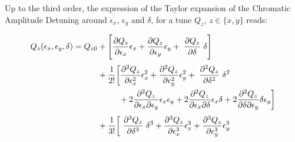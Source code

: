 Up to the third order, the expression of the Taylor expansion of the Chromatic Amplitude Detuning
around $\epsilon_x$, $\epsilon_y$ and $\delta$, for a tune $Q_z$, $z \in \{x, y\}$ reads:

\begin{equation}
\begin{aligned}
Q_z(\epsilon_x, \epsilon_y, \delta) = Q_{z0} &+ \left[\frac{\partial Q_z}{\partial \epsilon_x} \epsilon_x
                                                 + \frac{\partial Q_z}{\partial \epsilon_y} \epsilon_y
                                                 + \colorbox{yellow!0}{$\displaystyle \frac{\partial Q_z}{\partial \delta}$} \delta
                                                \right] \\
                                             &+ \frac{1}{2!} \biggl[\frac{\partial^2Q_z}{\partial \epsilon_x^2}\epsilon_x^2 
                                                 + \frac{\partial^2Q_z}{\partial \epsilon_y^2}\epsilon_y^2
                                                 + \colorbox{yellow!0}{$\displaystyle \frac{\partial^2 Q_z}{\partial \delta^2}$} \delta^2  \\
                                             &\;\begin{aligned}
                                             \phantom{+ \frac{1}{2!} \biggl[}
                                               &+ 2 \frac{\partial^2Q_z}{\partial \epsilon_x \partial \epsilon_y}\epsilon_x \epsilon_y
                                                  + 2 \frac{\partial^2Q_z}{\partial \epsilon_x \partial \delta}\epsilon_x \delta
                                                  + 2 \frac{\partial^2Q_z}{\partial \delta \partial \epsilon_y} \delta \epsilon_y
                                             \biggr] \\
                                             \end{aligned} \\
                                             &+ \frac{1}{3!}
                                             \biggl[
                                                  \colorbox{yellow!0}{$\displaystyle \frac{\partial^3 Q_z}{\partial \delta^3}$}\delta^{3}
                                                  + \frac{\partial^{3} Q_z}{\partial \epsilon_{x}^{3}}  \epsilon_{x}^{3} 
                                                  + \frac{\partial^{3} Q_z}{\partial \epsilon_{y}^{3}}  \epsilon_{y}^{3} \\
                                             &\;\begin{aligned}

\end{aligned}
\end{aligned}
\end{equation}
